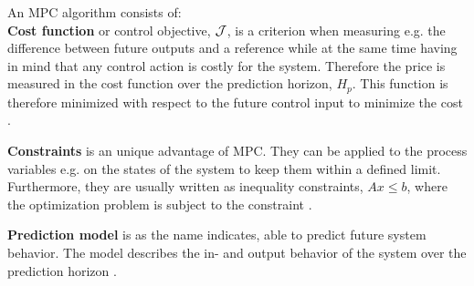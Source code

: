 An MPC algorithm consists of:
\\ 
\textbf{Cost function} or control objective, $\CMcal{J}$, is a criterion when measuring e.g. the difference between future outputs and a reference while at the same time having in mind that any control action is costly for the system. Therefore the price is measured in the cost function over the prediction horizon, $H_p$. This function is therefore minimized with respect to the future control input to minimize the cost \cite{mpc_control_lecture_notes}. %

\textbf{Constraints} is an unique advantage of MPC. They can be applied to the process variables e.g. on the states of the system  to keep them within a defined limit. %
Furthermore, they are usually written as inequality constraints, $Ax\leq b$, where the optimization problem is subject to the constraint \cite{mpc_control_lecture_notes}.   

\textbf{Prediction model} is as the name indicates, able to predict future system behavior. The model describes the in- and output behavior of the system over the prediction horizon \cite{mpc_control_lecture_notes}.  





